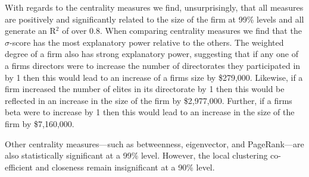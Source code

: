 \documentclass[11pt,fleqn]{article}
\begin{document}
With regards to the centrality measures we find, unsurprisingly, that all measures are positively and significantly related to the size of the firm at 99\% levels and all generate an R$^2$ of over 0.8. When comparing centrality measures we find that the $\sigma$-score has the most explanatory power relative to the others. The weighted degree of a firm also has strong explanatory power, suggesting that if any one of a firms directors were to increase the number of directorates they participated in by 1 then this would lead to an increase of a firms size by \$279,000. Likewise, if a firm increased the number of elites in its directorate by 1 then this would be reflected in an increase in the size of the firm by \$2,977,000. Further, if a firms beta were to increase by 1 then this would lead to an increase in the size of the firm by \$7,160,000.

Other centrality measures---such as betweenness, eigenvector, and PageRank---are also statistically significant at a 99\% level. However, the local clustering co-efficient and closeness remain insignificant at a 90\% level.
\end{document}
